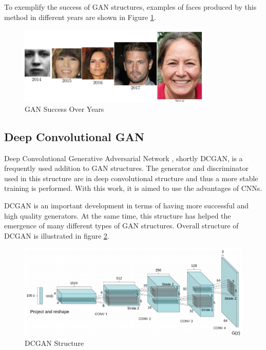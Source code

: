 To exemplify the success of GAN structures, examples of faces produced by this method in different years are shown in Figure \ref{fig:gan-success}.

\begin{figure}[h!]
    \centering
    \includegraphics{figures/chapter3/gan-success-over-years.png}
    \vspace*{3mm}
    \caption{GAN Success Over Years \cite{ganoverview}}
    \label{fig:gan-success}
\end{figure}

\subsection{Deep Convolutional GAN}

Deep Convolutional Generative Adversarial Network \cite{dcgan}, shortly DCGAN, is a frequently used addition to GAN structures. The generator and discriminator used in this structure are in deep convolutional structure and thus a more stable training is performed. With this work, it is aimed to use the advantages of CNNs.

DCGAN is an important development in terms of having more successful and high quality generators. At the same time, this structure has helped the emergence of many different types of GAN structures. Overall structure of DCGAN is illustrated in figure \ref{fig:dcgan}.

\begin{figure}[h!]
    \centering
    \includegraphics[scale=0.8]{figures/chapter3/dc-gan-structure.png}
    \caption{DCGAN Structure \cite{dcgan}}
    \label{fig:dcgan}
\end{figure}
\newpage
